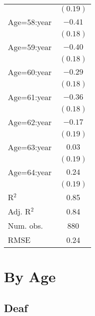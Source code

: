 \documentclass[fullpage]{paper}
\begin{document}
\begin{center}
\begin{longtable}{l c }
            & $(0.19)$ \\
Age=58:year & $-0.41$  \\
            & $(0.18)$ \\
Age=59:year & $-0.40$  \\
            & $(0.18)$ \\
Age=60:year & $-0.29$  \\
            & $(0.18)$ \\
Age=61:year & $-0.36$  \\
            & $(0.18)$ \\
Age=62:year & $-0.17$  \\
            & $(0.19)$ \\
Age=63:year & $0.03$   \\
            & $(0.19)$ \\
Age=64:year & $0.24$   \\
            & $(0.19)$ \\
\hline
R$^2$       & 0.85     \\
Adj. R$^2$  & 0.84     \\
Num. obs.   & 880      \\
RMSE        & 0.24     \\
\end{longtable}
\end{center}
\section{ By Age }

\subsection{ Deaf }
\end{document}
